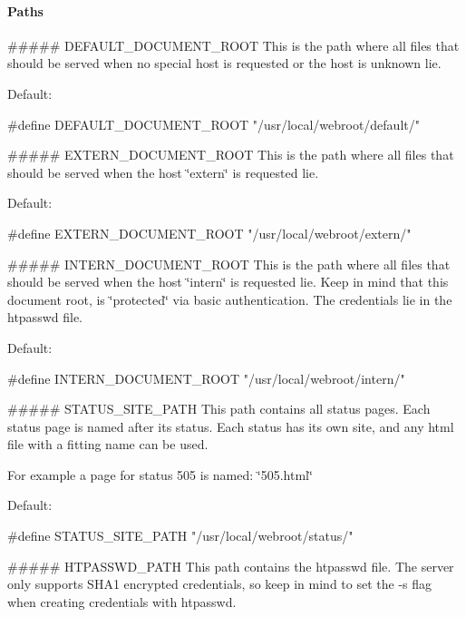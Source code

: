 \paragraph*{Paths}


\begin{DoxyItemize}
\item \#\#\#\#\# D\+E\+F\+A\+U\+L\+T\+\_\+\+D\+O\+C\+U\+M\+E\+N\+T\+\_\+\+R\+O\+OT This is the path where all files that should be served when no special host is requested or the host is unknown lie.

Default\+: \begin{DoxyVerb}#define DEFAULT_DOCUMENT_ROOT "/usr/local/webroot/default/"
\end{DoxyVerb}

\item \#\#\#\#\# E\+X\+T\+E\+R\+N\+\_\+\+D\+O\+C\+U\+M\+E\+N\+T\+\_\+\+R\+O\+OT This is the path where all files that should be served when the host \char`\"{}extern\char`\"{} is requested lie.

Default\+: \begin{DoxyVerb}#define EXTERN_DOCUMENT_ROOT "/usr/local/webroot/extern/"
\end{DoxyVerb}

\item \#\#\#\#\# I\+N\+T\+E\+R\+N\+\_\+\+D\+O\+C\+U\+M\+E\+N\+T\+\_\+\+R\+O\+OT This is the path where all files that should be served when the host \char`\"{}intern\char`\"{} is requested lie. Keep in mind that this document root, is \char`\"{}protected\char`\"{} via basic authentication. The credentials lie in the htpasswd file.

Default\+: \begin{DoxyVerb}#define INTERN_DOCUMENT_ROOT "/usr/local/webroot/intern/"
\end{DoxyVerb}

\item \#\#\#\#\# S\+T\+A\+T\+U\+S\+\_\+\+S\+I\+T\+E\+\_\+\+P\+A\+TH This path contains all status pages. Each status page is named after its status. Each status has its own site, and any html file with a fitting name can be used.

For example a page for status 505 is named\+: \char`\"{}505.\+html\char`\"{}

Default\+: \begin{DoxyVerb}#define STATUS_SITE_PATH "/usr/local/webroot/status/"
\end{DoxyVerb}

\item \#\#\#\#\# H\+T\+P\+A\+S\+S\+W\+D\+\_\+\+P\+A\+TH This path contains the htpasswd file. The server only supports S\+H\+A1 encrypted credentials, so keep in mind to set the -\/s flag when creating credentials with htpasswd.


\end{DoxyItemize}
